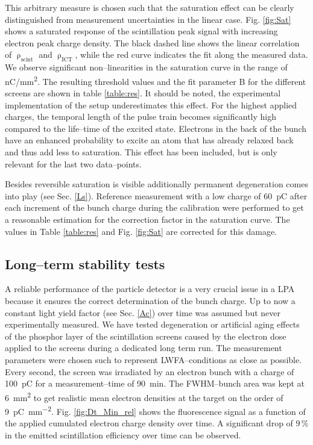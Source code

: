 \documentclass[%
preprint,
amsmath,
amssymb,
aip,
rsi, 
numerical,
floatfix,
]{revtex4-1}
\begin{document}
This arbitrary measure is chosen such that the saturation effect can be clearly distinguished from measurement uncertainties in the linear case. 
Fig. \ref{fig:Sat} shows a saturated response of the scintillation peak signal with increasing electron peak charge density. 
The black dashed line shows the linear correlation of $\uprho_{\text{scint}}$ and $\uprho_{\text{ICT}}$, while the red curve indicates the fit along the measured data. 
We observe significant non--linearities in the saturation curve in the range of \si[per-mode=symbol]{\nano\coulomb \per \square\milli\meter}. 
The resulting threshold values and the fit parameter B for the different screens are shown in table \ref{table:res}.
It should be noted, the experimental implementation of the setup underestimates this effect. 
For the highest applied charges, the temporal length of the pulse train becomes significantly high compared to the life--time of the excited state.
Electrons in the back of the bunch have an enhanced probability to excite an atom that has already relaxed back and thus add less to saturation.
This effect has been included, but is only relevant for the last two data--points.
 
Besides reversible saturation is visible additionally permanent degeneration comes into play (see Sec. \ref{Ls}).
Reference measurement with a low charge of \SI{60}{\pico\coulomb} after each increment of the bunch charge during the calibration were performed to get a reasonable estimation for the correction factor in the saturation curve.
The values in Table \ref{table:res} and Fig. \ref{fig:Sat} are corrected for this damage.      

\subsection{\label{Ls}Long--term stability tests}
A reliable performance of the particle detector is a very crucial issue in a LPA because it ensures the correct determination of the bunch charge.
Up to now a constant light yield factor (see Sec. \ref{Ac}) over time was assumed but never experimentally measured. 
We have tested degeneration or artificial aging effects of the phosphor layer of the scintillation screens caused by the electron dose applied to the screens during a dedicated long term run.
The measurement parameters were chosen such to represent LWFA--conditions as close as possible.
Every second, the screen was irradiated by an electron bunch with a charge of \SI{100}{\pico\coulomb} for a measurement--time of \SI{90}{\minute}.
The FWHM--bunch area was kept at \SI{6}{\square\milli\meter} to get realistic mean electron densities at the target on the order of \SI[per-mode=symbol]{9}{\pico\coulomb \per \square\milli\meter}. 
Fig. \ref{fig:Dt_Min_rel} shows the fluorescence signal as a function of the applied cumulated electron charge density over time. 
A significant drop of $9\,\%$ in the emitted scintillation efficiency over time can be observed.
 
\end{document}
